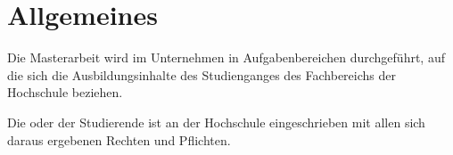 \section{Allgemeines}

Die Masterarbeit wird im Unternehmen in Aufgabenbereichen durchgeführt, auf die sich die Ausbildungsinhalte des Studienganges \studyprogram{} des Fachbereichs \departement{} der Hochschule \college{} beziehen.

Die oder der Studierende ist an der Hochschule \college{} eingeschrieben mit allen sich daraus ergebenen Rechten und Pflichten.
